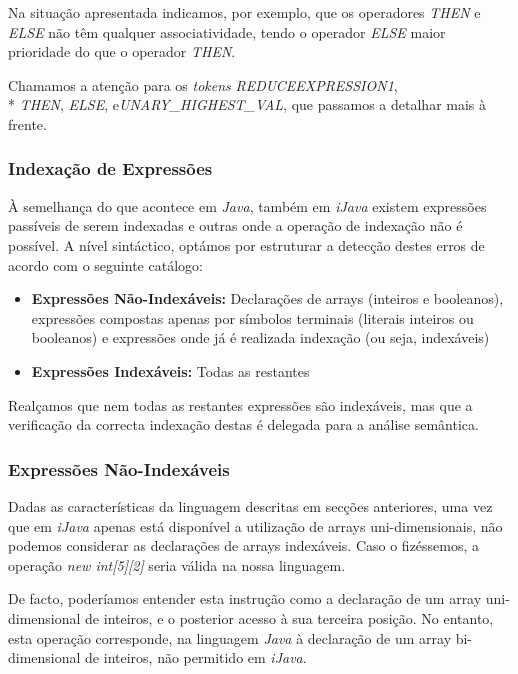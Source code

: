 \documentclass[11pt,a4paper]{article}
\begin{document}
Na situação apresentada indicamos, por exemplo, que os operadores \emph{THEN} e \emph{ELSE} não têm qualquer associatividade, tendo o operador \emph{ELSE} maior prioridade do que o operador \emph{THEN}.

Chamamos a atenção para os \emph{tokens} \emph{REDUCEEXPRESSION1}, \\* \emph{THEN}, \emph{ELSE}, e\emph{UNARY\_HIGHEST\_VAL}, que passamos a detalhar mais à frente.

\subsubsection{Indexação de Expressões}

À semelhança do que acontece em \emph{Java}, também em \emph{iJava} existem expressões passíveis de serem indexadas e outras onde a operação de indexação não é possível. A nível sintáctico, optámos por estruturar a detecção destes erros de acordo com o seguinte catálogo:

\begin{itemize}
\item \textbf{Expressões Não-Indexáveis:} Declarações de arrays (inteiros e booleanos), expressões compostas apenas por símbolos terminais (literais inteiros ou booleanos) e expressões onde já é realizada indexação (ou seja, indexáveis)

\item \textbf{Expressões Indexáveis:} Todas as restantes
\end{itemize}

Realçamos que nem todas as restantes expressões são indexáveis, mas que a verificação da correcta indexação destas é delegada para a análise semântica.

\subsubsection{Expressões Não-Indexáveis}

Dadas as características da linguagem descritas em secções anteriores, uma vez que em \emph{iJava} apenas está disponível a utilização de arrays uni-dimensionais, não podemos considerar as declarações de arrays indexáveis. Caso o fizéssemos, a operação \emph{new int[5][2]} seria válida na nossa linguagem.

De facto, poderíamos entender esta instrução como a declaração de um array uni-dimensional de inteiros, e o posterior acesso à sua terceira posição. No entanto, esta operação corresponde, na linguagem \emph{Java} à declaração de um array bi-dimensional de inteiros, não permitido em \emph{iJava}.
\end{document}
